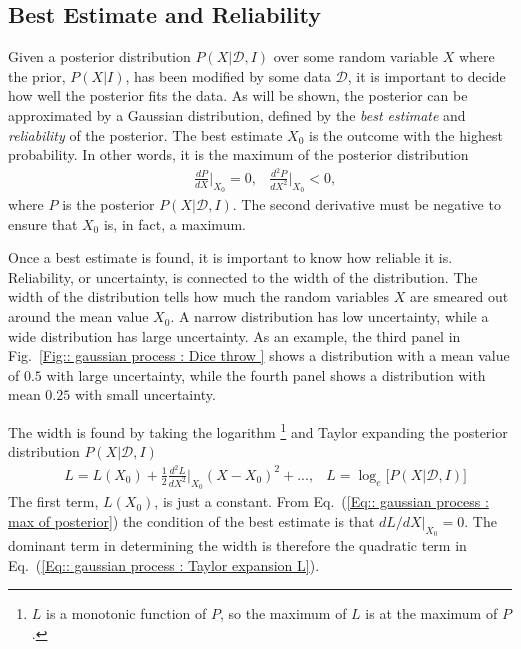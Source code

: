 \documentclass[twoside,english]{uiofysmaster}
\begin{document}
\subsection{Best Estimate and Reliability}

Given a posterior distribution $P(X| \mathcal{D}, I)$ over some random variable $X$ where the prior, $P(X|I)$, has been modified by some data $\mathcal{D}$, it is important to decide how well the posterior fits the data. As will be shown, the posterior can be approximated by a Gaussian distribution, defined by the \textit{best estimate} and \textit{reliability} of the posterior. The best estimate $X_0$  is the outcome with the highest probability. In other words, it is the maximum of the posterior distribution
\begin{align}\label{Eq:: gaussian process : max of posterior}
&\frac{dP}{dX}\Big|_{X_0} = 0, &\frac{d^2P}{dX^2}\Big|_{X_0} < 0,
\end{align}
where $P$ is the posterior $P(X| \mathcal{D}, I)$. The second derivative must be negative to ensure that $X_0$ is, in fact, a maximum. 

Once a best estimate is found, it is important to know how reliable it is. Reliability, or uncertainty, is connected to the width of the distribution. The width of the distribution tells how much the random variables $X$ are smeared out around the mean value $X_0$. A narrow distribution has low uncertainty, while a wide distribution has large uncertainty. As an example, the third panel in Fig.~\ref{Fig:: gaussian process : Dice throw } shows a distribution with a mean value of $0.5$ with large uncertainty, while the fourth panel shows a distribution with mean $0.25$ with small uncertainty. 

The width is found by taking the logarithm \footnote{$L$ is a monotonic function of $P$, so the maximum of $L$ is at the maximum of $P$.} and Taylor expanding the posterior distribution $P(X| \mathcal{D}, I)$
\begin{align}
&L = L(X_0) + \frac{1}{2} \frac{d^2L}{dX^2}\Big|_{X_0} (X-X_0)^2 +... ,&L = \log_e \Big[P(X | \mathcal{D}, I ) \Big]\label{Eq:: gaussian process : Taylor expansion L}
\end{align}
The first term, $L(X_0)$, is just a constant. From Eq.~(\ref{Eq:: gaussian process : max of posterior}) the condition of the best estimate is that $dL/dX|_{X_0} =0$. The dominant term in determining the width is therefore the quadratic term in Eq.~(\ref{Eq:: gaussian process : Taylor expansion L}).
\end{document}
